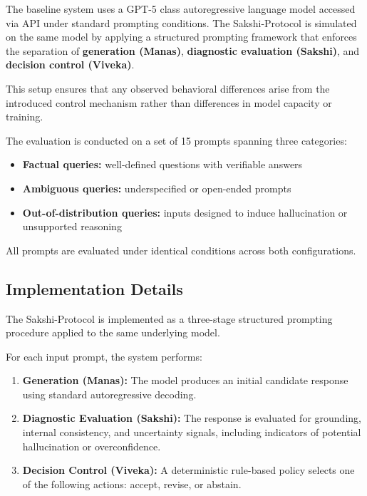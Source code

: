 \documentclass[12pt,a4paper]{article}
\begin{document}
The baseline system uses a GPT-5 class autoregressive language model accessed via API under standard prompting conditions. The Sakshi-Protocol is simulated on the same model by applying a structured prompting framework that enforces the separation of \textbf{generation (Manas)}, \textbf{diagnostic evaluation (Sakshi)}, and \textbf{decision control (Viveka)}.

This setup ensures that any observed behavioral differences arise from the introduced control mechanism rather than differences in model capacity or training.

The evaluation is conducted on a set of 15 prompts spanning three categories:

\begin{itemize}
\item \textbf{Factual queries:} well-defined questions with verifiable answers
\item \textbf{Ambiguous queries:} underspecified or open-ended prompts
\item \textbf{Out-of-distribution queries:} inputs designed to induce hallucination or unsupported reasoning
\end{itemize}

All prompts are evaluated under identical conditions across both configurations.

\subsection{Implementation Details}

The Sakshi-Protocol is implemented as a three-stage structured prompting procedure applied to the same underlying model.

For each input prompt, the system performs:

\begin{enumerate}
\item \textbf{Generation (Manas):} The model produces an initial candidate response using standard autoregressive decoding.
\item \textbf{Diagnostic Evaluation (Sakshi):} The response is evaluated for grounding, internal consistency, and uncertainty signals, including indicators of potential hallucination or overconfidence.
\item \textbf{Decision Control (Viveka):} A deterministic rule-based policy selects one of the following actions: accept, revise, or abstain.
\end{enumerate}
\end{document}
